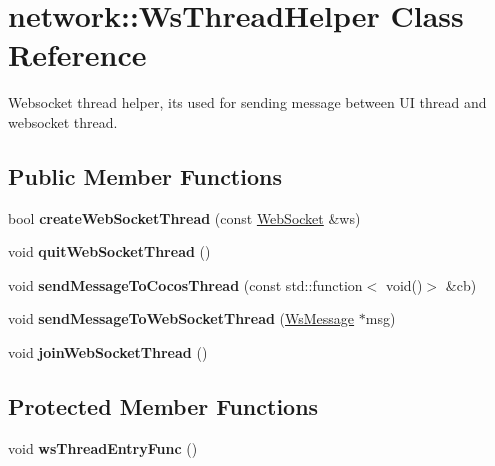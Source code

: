 \hypertarget{classnetwork_1_1WsThreadHelper}{}\section{network\+:\+:Ws\+Thread\+Helper Class Reference}
\label{classnetwork_1_1WsThreadHelper}


Websocket thread helper, it\textquotesingle{}s used for sending message between UI thread and websocket thread.  


\subsection*{Public Member Functions}
\begin{DoxyCompactItemize}
\item 
\mbox{\label{classnetwork_1_1WsThreadHelper_ad668f0e5e9c130998d6d95c3ce9c334a}} 
bool {\bfseries create\+Web\+Socket\+Thread} (const \hyperlink{classnetwork_1_1WebSocket}{Web\+Socket} \&ws)
\item 
\mbox{\label{classnetwork_1_1WsThreadHelper_a85987f9606bf608be10a91ed7841f823}} 
void {\bfseries quit\+Web\+Socket\+Thread} ()
\item 
\mbox{\label{classnetwork_1_1WsThreadHelper_a88548dac7027a484c62c1dec10967eb9}} 
void {\bfseries send\+Message\+To\+Cocos\+Thread} (const std\+::function$<$ void()$>$ \&cb)
\item 
\mbox{\label{classnetwork_1_1WsThreadHelper_a422ed08336e71d9aa8e8c8e3f385accb}} 
void {\bfseries send\+Message\+To\+Web\+Socket\+Thread} (\hyperlink{classnetwork_1_1WsMessage}{Ws\+Message} $\ast$msg)
\item 
\mbox{\label{classnetwork_1_1WsThreadHelper_a14d85c3decad2dea0c10e4822e174888}} 
void {\bfseries join\+Web\+Socket\+Thread} ()
\end{DoxyCompactItemize}
\subsection*{Protected Member Functions}
\begin{DoxyCompactItemize}
\item 
\mbox{\label{classnetwork_1_1WsThreadHelper_a76cdbf75f011ce54eaf400154593d70c}} 
void {\bfseries ws\+Thread\+Entry\+Func} ()
\end{DoxyCompactItemize}
